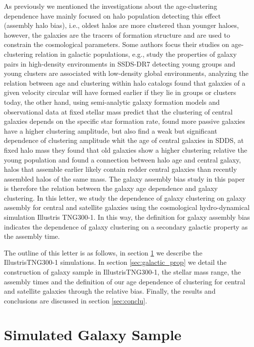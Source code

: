 \documentclass[a4paper,fleqn,usenatbib]{mnras}
\begin{document}
As previously we mentioned the investigations about the age-clustering
dependence have mainly focused on halo population detecting this
effect (assembly halo bias), i.e., oldest halos are more clustered
than younger haloes, however, the galaxies are the tracers of
formation structure and are used to constrain the cosmological
parameters. Some authors focus their studies on age-clustering
relation in galactic populations, e.g., \citet{2012A&A...539A..46A}
study the properties of galaxy pairs in high-density environments in
SSDS-DR7 detecting young groups and young clusters are associated with
low-density global environments, \citet{2007MNRAS.378..777R} analyzing
the relation between age and clustering within halo catalogs found
that galaxies of a given velocity circular will have formed earlier if
they lie in groups or clusters today, the other hand, using
semi-analytic galaxy formation models and observational data at fixed
stellar mass \citet{2013MNRAS.433..515W} predict that the clustering
of central galaxies depends on the specific star formation rate, found
more passive galaxies have a higher clustering amplitude, but
\citet{Lacerna_2014} also find a weak but significant dependence of
clustering amplitude whit the age of central galaxies in SDDS, at
fixed halo mass they found that old galaxies show a higher clustering
relative the young population and \citet{Berlind:2006eb} found a
connection between halo age and central galaxy, halos that assemble
earlier likely contain redder central galaxies than recently assembled
halos of the same mass. The galaxy assembly bias study in this paper
is therefore the relation between the galaxy age dependence and galaxy
clustering. In this letter, we study the dependence of galaxy
clustering on galaxy assembly for central and satellite galaxies using
the cosmological hydro-dynamical simulation Illustris TNG300-1. In
this way, the definition for galaxy assembly bias indicates the
dependence of galaxy clustering on a secondary galactic property as
the assembly time. 

The outline of this letter is as follows, in section \ref{sec:simul}
we describe the IllustrisTNG300-1 simulations. In section
\ref{sec:galactic_prop} we detail the construction of galaxy sample in
IllustrisTNG300-1, the stellar mass range, the assembly times and the
definition of our age dependence of clustering for central and
satellite galaxies through the relative bias. Finally, the results and
conclusions are discussed in section \ref{sec:conclu}. 


\section{Simulated Galaxy Sample}
\label{sec:simul} %
\end{document}
